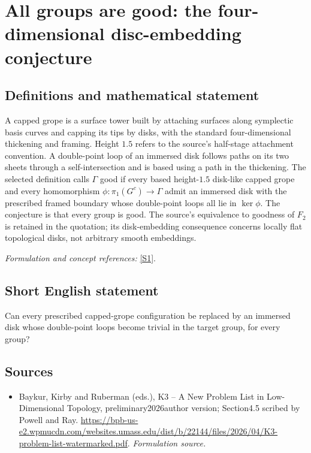 \documentclass[11pt]{article}
\begin{document}
\section*{\texorpdfstring{All groups are good: the four-dimensional disc-embedding conjecture}{All groups are good: the four-dimensional disc-embedding conjecture}}\label{statement}
\subsection{Definitions and mathematical statement}
A capped grope is a surface tower built by attaching surfaces along symplectic basis curves and capping its tips by disks, with the standard four-dimensional thickening and framing. Height $1.5$ refers to the source's half-stage attachment convention. A double-point loop of an immersed disk follows paths on its two sheets through a self-intersection and is based using a path in the thickening. The selected definition calls $\Gamma$ good if every based height-$1.5$ disk-like capped grope and every homomorphism
$\phi:\pi_1(G^c)\to\Gamma$ admit an immersed disk with the prescribed framed boundary whose double-point loops all lie in $\ker\phi$. The conjecture is that every group is good. The source's equivalence to goodness of $F_2$ is retained in the quotation; its disk-embedding consequence concerns locally flat topological disks, not arbitrary smooth embeddings.
\par\smallskip\textit{Formulation and concept references:} \href{https://bpb-us-e2.wpmucdn.com/websites.umass.edu/dist/b/22144/files/2026/04/K3-problem-list-watermarked.pdf}{[S1]}.

\subsection{Short English statement}
Can every prescribed capped-grope configuration be replaced by an immersed disk whose double-point loops become trivial in the target group, for every group?
\subsection{Sources}
\begin{itemize}
\item[S1]Baykur, Kirby and Ruberman (eds.), K3 – A New Problem List in Low-Dimensional Topology, preliminary2026author version; Section4.5 scribed by Powell and Ray.
\url{https://bpb-us-e2.wpmucdn.com/websites.umass.edu/dist/b/22144/files/2026/04/K3-problem-list-watermarked.pdf}.
\textit{Formulation source.}
\end{itemize}
\end{document}
